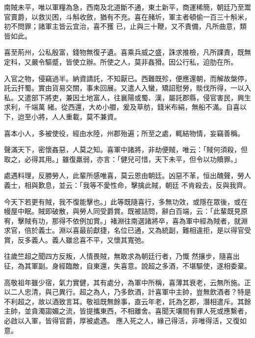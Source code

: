 \begin{pinyinscope}
 南賊未平，唯以軍糧為急，西南及北道斷不通，東土新平，商運稀簡，朝廷乃至鬻官賣爵，以救災困，斗斛收斂，猶有不充。喜在赭圻，軍主者頓偷一百三十斛米，初不問罪；諸軍主皆云宜治，喜不獲
 已，止與三十鞭，又不責備，凡所曲意，類皆如此。



 喜至荊州，公私殷富，錢物無復孑遺。喜乘兵威之盛，誅求推檢，凡所課責，既無定科，又嚴令驅蹙，皆使立辦。所使之人，莫非姦猾。因公行私，迫肋在所。



 入官之物，侵竊過半。納資請託，不知厭已。西難既殄，便應還朝，而解故槃停，託云扞蜀。實由貨易交關，事未回展。又遣人入蠻，矯詔慰勞，賧伐所得，一以入私。又遣部下將吏，兼因土地富人，往襄陽或蜀、漢，屬託郡縣，侵官害民，興生求利，千端萬
 緒。從西還，大め小艒，爰及草舫，錢米布絹，無船不滿。自喜以下，迨至小將，人人重載，莫不兼資。



 喜本小人，多被使役，經由水陸，州郡殆遍；所至之處，輒結物情，妄竊善稱。



 聲滿天下，密懷姦惡，人莫之知。喜軍中諸將，非劫便賊，唯云：「賊何須殺，但取之，必得其用。」雖復羸弱，亦言：「健兒可惜，天下未平，但令以功贖罪。」



 處遇料理，反勝勞人，此輩所感唯喜，莫云恩由朝廷。凶惡不革，恒出醜聲，勞人義士，相與歎息，並云：「我等不愛性命，擊擒此賊，朝廷
 不肯殺去，反與我齊。



 今天下若更有賊，我不復能擊也。」此等既隨喜行，多無功效，或隱在眾後，或在幔屋中眠。賊即破散，與勞人同受爵賞。既被詰問，辭白百端，云：「此輩既見原宥，擊賊有功，那得不依例加賞。」褚淵往南選諸將卒，喜為軍中經為賊者，就淵求官，倍於義士。淵以喜最前獻捷，名位已通，又為統副，難相違拒，是以得官受賞，反多義人。義人雖忿喜不平，又懷其寬弛。



 往歲竺超之聞四方反叛，人情畏賊，無敢求為朝廷行者，乃慨
 然攘步，隨喜出征，為其軍副。身經臨敵，自東還，失喜意。說超之多酒，不堪驅使，遂相委棄。



 高敬祖年雖少宿，氣力實健，其有處分，為軍中所稱，喜薄其衰老，云無所施。正以二人忠清，與己異行。超之為人，乃多飲酒，計喜軍中主帥，豈無飲酒者？特是不利超之，故以酒致言耳。敬祖既無餘事，直云年老，託為乞郡，潛相遣斥。其餘主帥，並貪濁謅媚之流，皆提攜東西，不相離舍。喜聞天壤間有罪人死或應繫者，必啟以入軍，皆得官爵，厚被處遇。
 應入死之人，緣己得活，非唯得活，又復如意。




\end{pinyinscope}
